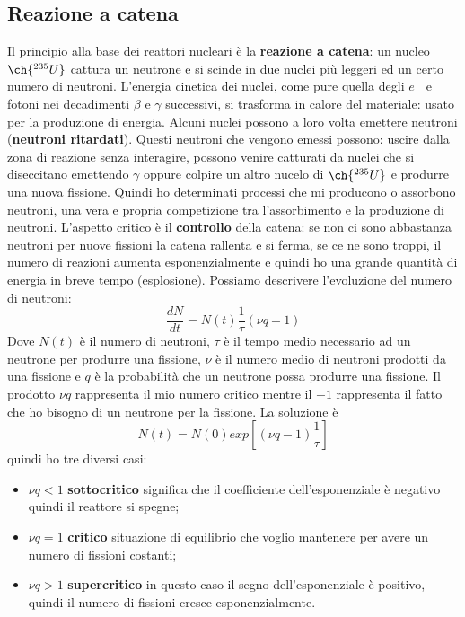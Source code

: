 \subsection{Reazione a catena}
Il principio alla base dei reattori nucleari è la \textbf{reazione a catena}: un nucleo $\ch{^{235}U}$ cattura un neutrone e si scinde in due nuclei più leggeri ed un certo numero di neutroni. L'energia cinetica dei nuclei, come pure quella degli $e^-$ e fotoni nei decadimenti $\beta$ e $\gamma$ successivi, si trasforma in calore del materiale: usato per la produzione di energia. Alcuni nuclei possono a loro volta emettere neutroni (\textbf{neutroni ritardati}). Questi neutroni che vengono emessi possono: uscire dalla zona di reazione senza interagire, possono venire catturati da nuclei che si diseccitano emettendo $\gamma$ oppure colpire un altro nucelo di $\ch{^{235}U}$ e produrre una nuova fissione. Quindi ho determinati processi che mi producono o assorbono neutroni, una vera e propria competizione tra l'assorbimento e la produzione di neutroni. L'aspetto critico è il \textbf{controllo} della catena: se non ci sono abbastanza neutroni per nuove fissioni la catena rallenta e si ferma, se ce ne sono troppi, il numero di reazioni aumenta esponenzialmente e quindi ho una grande quantità di energia in breve tempo (esplosione).
Possiamo descrivere l'evoluzione del numero di neutroni:
\begin{equation*}
    \frac{dN}{dt}=N(t)\frac{1}{\tau}(\nu q-1)
\end{equation*}
Dove $N(t)$ è il numero di neutroni, $\tau$ è il tempo medio necessario ad un neutrone per produrre una fissione, $\nu$ è il numero medio di neutroni prodotti da una fissione e $q$ è la probabilità che un neutrone possa produrre una fissione. Il prodotto $\nu q$ rappresenta il mio numero critico mentre il $-1$ rappresenta il fatto che ho bisogno di un neutrone per la fissione. La soluzione è
\begin{equation*}
    N(t)=N(0)exp\left[(\nu q-1)\frac{1}{\tau}\right]
\end{equation*}
quindi ho tre diversi casi:
\begin{itemize}
    \item $\nu q<1$ \textbf{sottocritico} significa che il coefficiente dell'esponenziale è negativo quindi il reattore si spegne;
    \item $\nu q=1$ \textbf{critico} situazione di equilibrio che voglio mantenere per avere un numero di fissioni costanti;
    \item $\nu q>1$ \textbf{supercritico} in questo caso il segno dell'esponenziale è positivo, quindi il numero di fissioni cresce esponenzialmente.
\end{itemize}
